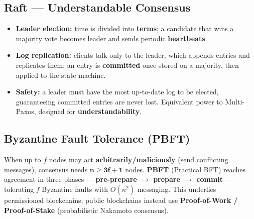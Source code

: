 \documentclass[11pt,a4paper]{article}
\begin{document}
\subsection{Raft --- Understandable Consensus}
\begin{center}
\end{center}
\begin{itemize}[leftmargin=*, itemsep=2pt]
  \item \textbf{Leader election:} time is divided into \textbf{terms}; a candidate that wins a majority vote becomes leader and sends periodic \textbf{heartbeats}.
  \item \textbf{Log replication:} clients talk only to the leader, which appends entries and replicates them; an entry is \textbf{committed} once stored on a majority, then applied to the state machine.
  \item \textbf{Safety:} a leader must have the most up-to-date log to be elected, guaranteeing committed entries are never lost. Equivalent power to Multi-Paxos, designed for \textbf{understandability}.
\end{itemize}

\subsection{Byzantine Fault Tolerance (PBFT)}
\begin{alertbox}
When up to $f$ nodes may act \textbf{arbitrarily/maliciously} (send conflicting messages), consensus needs $\mathbf{n \ge 3f + 1}$ nodes. \textbf{PBFT} (Practical BFT) reaches agreement in three phases --- \textbf{pre-prepare $\to$ prepare $\to$ commit} --- tolerating $f$ Byzantine faults with $O(n^2)$ messaging. This underlies permissioned blockchains; public blockchains instead use \textbf{Proof-of-Work / Proof-of-Stake} (probabilistic Nakamoto consensus).
\end{alertbox}
\end{document}
